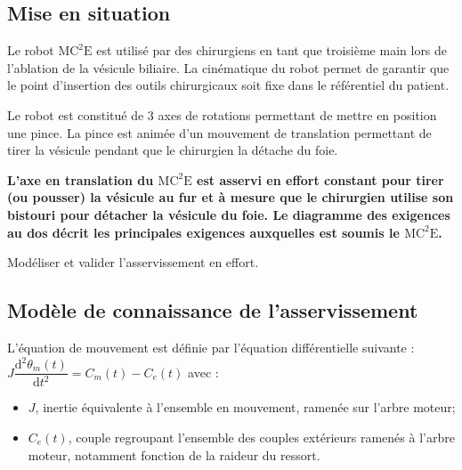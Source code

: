 \documentclass[10pt,fleqn]{article} %
\begin{document}

\vspace{4.5cm}
\pagestyle{fancy}
\thispagestyle{plain}


\def\columnseprulecolor{\color{ocre}}
\setlength{\columnseprule}{0.4pt} 

\ifprof
\else
\fi
\begin{multicols}{2}
\section*{Mise en situation}
\ifprof
\else
Le robot $\text{MC}^2\text{E}$ est utilisé par des chirurgiens en tant que troisième main lors de l'ablation de la vésicule biliaire. La cinématique du robot permet de garantir que le point d'insertion des outils chirurgicaux soit fixe dans le référentiel du patient. 

Le robot est constitué de 3 axes de rotations permettant de mettre en position une pince. La pince est animée d'un mouvement de translation permettant de tirer la vésicule pendant que le chirurgien la détache du foie. 

\textbf{L’axe en translation du $\text{MC}^2\text{E}$ est asservi en effort constant pour tirer (ou pousser) la vésicule au fur et à mesure que le chirurgien utilise son bistouri pour détacher la vésicule du foie. Le diagramme des exigences au dos décrit les principales exigences auxquelles est soumis le $\text{MC}^2\text{E}$.}


\begin{obj}
Modéliser et valider l’asservissement en effort.
\end{obj}

\fi


\subsection*{Modèle de connaissance de l'asservissement}
\ifprof
\else
L’équation de mouvement est définie par l’équation différentielle suivante : 
$J\dfrac{\text{d}^2\theta_m(t)}{\text{d}t^2}=C_m(t)-C_e(t)$  avec :
\begin{itemize}
\item $J$, inertie équivalente à l’ensemble en mouvement, ramenée sur l’arbre moteur;
\item $C_e(t)$, couple regroupant l’ensemble des couples extérieurs ramenés à l’arbre moteur, notamment fonction de la raideur du ressort.
\end{itemize}



\end{multicols}
\end{document}
